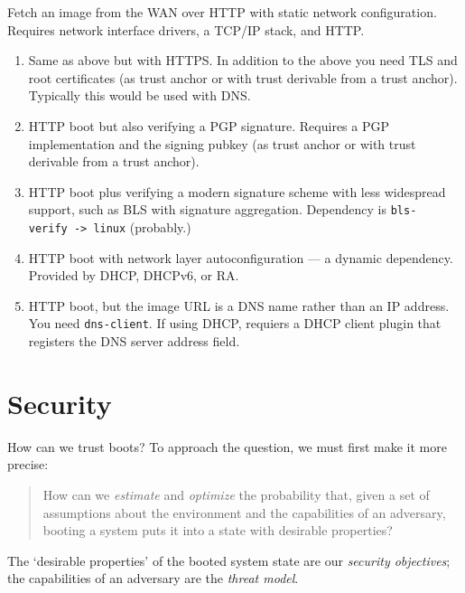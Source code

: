\begin{example}

  Fetch an image from the WAN over HTTP with static network configuration. 
  Requires network interface drivers, a TCP/IP stack, and HTTP. 
  
  \begin{enumerate}
  \item Same as above but with HTTPS. 
  In addition to the above you need TLS and root certificates (as trust anchor or with trust derivable from a trust anchor). 
  Typically this would be used with DNS.

  \item HTTP boot but also verifying a PGP signature. 
  Requires a PGP implementation and the signing pubkey (as trust anchor or with trust derivable from a trust anchor). 
  
  \item HTTP boot plus verifying a modern signature scheme with less widespread support, such as BLS with signature aggregation. 
  Dependency is \texttt{bls-verify\ -\textgreater{}\ linux} (probably.) 
  
  \item HTTP boot with network layer autoconfiguration --- a dynamic dependency. 
  Provided by DHCP, DHCPv6, or RA. 
  
  \item HTTP boot, but the image URL is a DNS name rather than an IP address. 
  You need \texttt{dns-client}. If using DHCP, requiers a DHCP client plugin that registers the DNS server address field.
  \end{enumerate}

\end{example}

\section{Security} \label{security}

How can we trust boots?
%
To approach the question, we must first make it more precise:
\begin{quote}
  How can we \emph{estimate} and \emph{optimize} the probability that, given a set of assumptions about the environment and the capabilities of an adversary, booting a system puts it into a state with desirable properties?
\end{quote}
The `desirable properties' of the booted system state are our \emph{security objectives}; the capabilities of an adversary are the \emph{threat model}.

